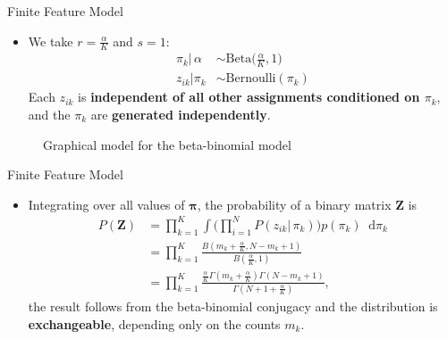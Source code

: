 \documentclass[aspectratio=169,xcolor=dvipsnames]{beamer}
\newcommand*\diff{\mathop{}\!\mathrm{d}}
\newcommand{\vecpi}{\boldsymbol{\pi}}
\newcommand{\matz}{\textbf{Z}}
\newcommand{\aOverK}{\frac{\alpha}{K}}
\begin{document}
\begin{frame}{Finite Feature Model}
\setlength{\leftmargini}{0.2cm}
\begin{itemize}
\item We  take $r = \aOverK$ and $s=1$:
\begin{align*}
    \pi_k | \, \alpha &\sim \text{Beta}\Big(\aOverK,1 ) \\ z_{ik} | \pi_k & \sim \text{Bernoulli}(\pi_k)
\end{align*}
Each $z_{ik}$ is\textbf{ independent of all other assignments conditioned on $\pi_k$}, and the $\pi_k$ are \textbf{generated independently}.
\end{itemize}
\vspace{1pt}
\begin{figure}
\begin{center} 
\caption{Graphical model for the beta-binomial model}
\label{fig:beta-binomial}
\end{center}
\end{figure}
\end{frame}
\begin{frame}{Finite Feature Model}
\setlength{\leftmargini}{0.2cm}
\begin{itemize}
\item Integrating over all values of $\vecpi$,  the probability of a binary matrix $\matz$ is
\begin{align}
    P(\matz) &= \prod_{k=1}^{K} \int  \bigg( \prod_{i=1}^{N}P(z_{ik}| \, \pi_k)\bigg)p(\pi_k) \diff \pi_k \nonumber \\
    &= \prod_{k=1}^{K} \frac{B(m_k + \aOverK, N-m_k+1)}{B(\aOverK,1)} \nonumber \\
    &= \prod_{k=1}^{K} \frac{\aOverK\Gamma(m_k+\aOverK)\Gamma(N-m_k+1)}{\Gamma(N+1+\aOverK)}, \label{eq:finiteFeature}
\end{align}
the result follows from the beta-binomial conjugacy and the distribution is  \textbf{exchangeable}, depending only on the counts $m_k$.
\end{itemize}
\end{frame}
\end{document}
